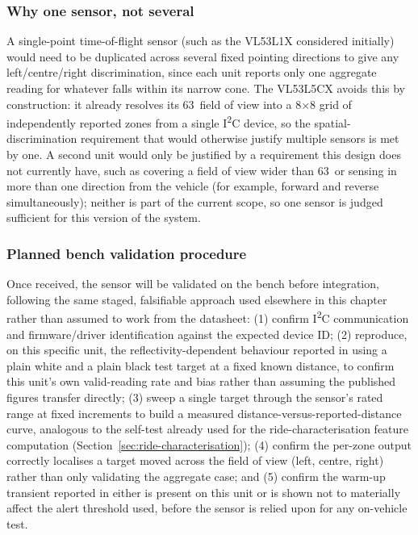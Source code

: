 \subsubsection*{Why one sensor, not several}

A single-point time-of-flight sensor (such as the VL53L1X considered initially) would need to be duplicated across several fixed pointing directions to give any left/centre/right discrimination, since each unit reports only one aggregate reading for whatever falls within its narrow cone. The VL53L5CX avoids this by construction: it already resolves its 63\textdegree\ field of view into a 8$\times$8 grid of independently reported zones from a single I\textsuperscript{2}C device, so the spatial-discrimination requirement that would otherwise justify multiple sensors is met by one. A second unit would only be justified by a requirement this design does not currently have, such as covering a field of view wider than 63\textdegree\ or sensing in more than one direction from the vehicle (for example, forward and reverse simultaneously); neither is part of the current scope, so one sensor is judged sufficient for this version of the system.

\subsubsection*{Planned bench validation procedure}

Once received, the sensor will be validated on the bench before integration, following the same staged, falsifiable approach used elsewhere in this chapter rather than assumed to work from the datasheet: (1) confirm I\textsuperscript{2}C communication and firmware/driver identification against the expected device ID; (2) reproduce, on this specific unit, the reflectivity-dependent behaviour reported in \cite{caroleo2026} using a plain white and a plain black test target at a fixed known distance, to confirm this unit's own valid-reading rate and bias rather than assuming the published figures transfer directly; (3) sweep a single target through the sensor's rated range at fixed increments to build a measured distance-versus-reported-distance curve, analogous to the self-test already used for the ride-characterisation feature computation (Section~\ref{sec:ride-characterisation}); (4) confirm the per-zone output correctly localises a target moved across the field of view (left, centre, right) rather than only validating the aggregate case; and (5) confirm the warm-up transient reported in \cite{caroleo2026} either is present on this unit or is shown not to materially affect the alert threshold used, before the sensor is relied upon for any on-vehicle test.


